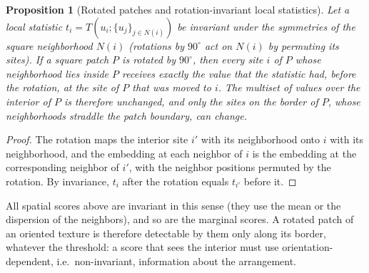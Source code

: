 \documentclass[preprint,review,12pt]{elsarticle}
\newtheorem{proposition}{Proposition}
\begin{document}
\begin{proposition}[Rotated patches and rotation-invariant local statistics]
\label{prop:rot}
Let a local statistic $t_i=T(u_i;\{u_j\}_{j\in N(i)})$ be invariant under the symmetries of the square neighborhood $N(i)$ (rotations by $90^\circ$ act on $N(i)$ by permuting its sites). If a square patch $P$ is rotated by $90^\circ$, then every site $i$ of $P$ whose neighborhood lies inside $P$ receives exactly the value that the statistic had, before the rotation, at the site of $P$ that was moved to $i$. The multiset of values over the interior of $P$ is therefore unchanged, and only the sites on the border of $P$, whose neighborhoods straddle the patch boundary, can change.
\end{proposition}
\begin{proof}
The rotation maps the interior site $i'$ with its neighborhood onto $i$ with its neighborhood, and the embedding at each neighbor of $i$ is the embedding at the corresponding neighbor of $i'$, with the neighbor positions permuted by the rotation. By invariance, $t_i$ after the rotation equals $t_{i'}$ before it.
\end{proof}
All spatial scores above are invariant in this sense (they use the mean or the dispersion of the neighbors), and so are the marginal scores. A rotated patch of an oriented texture is therefore detectable by them only along its border, whatever the threshold: a score that sees the interior must use orientation-dependent, i.e.\ non-invariant, information about the arrangement.

\begin{table}[t]
\caption{Assumptions and scope of the analytical statements, and where each is checked.}
\label{tab:props}
\centering\small
{}
\end{table}
\end{document}
